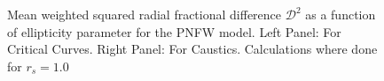 \documentclass[useAMS,usenatbib]{mn2e}
\begin{document}
\begin{figure}
\begin{center}
\caption{\label{d2_pnfw} Mean weighted squared radial fractional difference $\mathcal{D}^2$  as a function of ellipticity parameter for the PNFW model. Left Panel: For Critical Curves. Right Panel: For Caustics. Calculations where done for $r_s=1.0$}
\end{center}
\end{figure}
\end{document}
